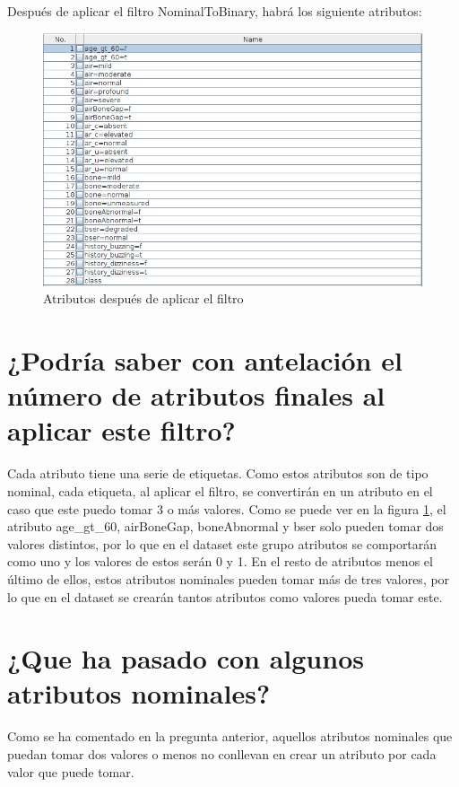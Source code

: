 \documentclass[11pt,twoside,a4paper]{book}
\begin{document}
Después de aplicar el filtro NominalToBinary, habrá los siguiente atributos:

\begin{figure}[H]
	\includegraphics[width=\textwidth]{ejercicio2_1.png}
	\caption{Atributos después de aplicar el filtro}
	\label{Fig5}
\end{figure}

\section{¿Podría saber con antelación el número de atributos finales al aplicar este filtro?}
Cada atributo tiene una serie de etiquetas. Como estos atributos son de tipo nominal,
cada etiqueta, al aplicar el filtro, se convertirán en un atributo en el caso que
este puedo tomar 3 o más valores. Como se puede ver en la figura \ref{Fig5}, el
atributo age\_gt\_60, airBoneGap, boneAbnormal y bser solo pueden tomar dos valores
distintos, por lo que en el dataset este grupo atributos se comportarán como uno
y los valores de estos serán 0 y 1. En el resto de atributos menos el último de ellos,
estos atributos nominales pueden tomar más de tres valores, por lo que en el dataset
se crearán tantos atributos como valores pueda tomar este.

\section{¿Que ha pasado con algunos atributos nominales?}
Como se ha comentado en la pregunta anterior, aquellos atributos nominales que puedan
tomar dos valores o menos no conllevan en crear un atributo por cada valor que puede tomar.
\end{document}
